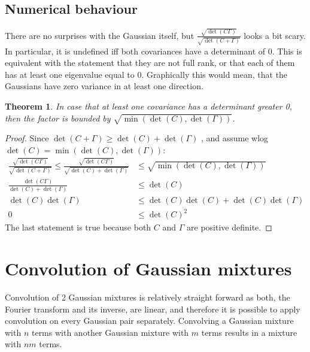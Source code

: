 \documentclass{paper}
\newtheorem{theorem}{Theorem}
\newcommand{\f}[1]{\operatorname{#1}}
\begin{document}
\subsection{Numerical behaviour}
There are no surprises with the Gaussian itself, but $\frac{\sqrt{\f{det}(C\Gamma)}}{\sqrt{\f{det}(C+\Gamma)}}$ looks a bit scary.
In particular, it is undefined iff both covariances have a determinant of 0.
This is equivalent with the statement that they are not full rank, or that each of them has at least one eigenvalue equal to 0.
Graphically this would mean, that the Gaussians have zero variance in at least one direction.

\begin{theorem}
	In case that at least one covariance has a determinant greater 0, then the factor is bounded by $\sqrt{\f{min}(\f{det}(C), \f{det}(\Gamma))}$.
\end{theorem}
\begin{proof}
Since $\f{det}(C+\Gamma) \ge \f{det}(C) + \f{det}(\Gamma)$ \cite{wiki_det_inequalities}, and assume wlog $\f{det}(C) = \f{min}(\f{det}(C), \f{det}(\Gamma))$:
\begin{align*}
	\frac{\sqrt{\f{det}(C\Gamma)}}{\sqrt{\f{det}(C+\Gamma)}} \le \frac{\sqrt{\f{det}(C\Gamma)}}{\sqrt{\f{det}(C) + \f{det}(\Gamma)}} &\le \sqrt{\f{min}(\f{det}(C), \f{det}(\Gamma))} \\
	\frac{\f{det}(C\Gamma)}{\f{det}(C) + \f{det}(\Gamma)} &\le \f{det}(C) \\
	\f{det}(C)\f{det}(\Gamma) &\le \f{det}(C)\f{det}(C) + \f{det}(C)\f{det}(\Gamma) \\
	0 &\le \f{det}(C)^2
\end{align*}
The last statement is true because both $C$ and $\Gamma$ are positive definite.
\end{proof}

\section{Convolution of Gaussian mixtures}
Convolution of 2 Gaussian mixtures is relatively straight forward as both, the Fourier transform and its inverse, are linear, and therefore it is possible to apply convolution on every Gaussian pair separately.
Convolving a Gaussian mixture with $n$ terms with another Gaussian mixture with $m$ terms results in a mixture with $nm$ terms.
\end{document}

